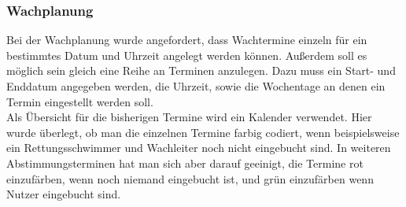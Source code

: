 \documentclass[fontsize=12pt,openright,oneside,paper=a4,BCOR=1cm]{scrbook}
\begin{document}
\subsubsection{Wachplanung}
Bei der Wachplanung wurde angefordert, dass Wachtermine einzeln für ein bestimmtes Datum und Uhrzeit angelegt werden können. Außerdem soll es möglich sein gleich eine Reihe an Terminen anzulegen. Dazu muss ein Start- und Enddatum angegeben werden, die Uhrzeit, sowie die Wochentage an denen ein Termin eingestellt werden soll. \\
Als Übersicht für die bisherigen Termine wird ein Kalender verwendet. Hier wurde überlegt, ob man die einzelnen Termine farbig codiert, wenn beispielsweise ein \glqq Rettungsschwimmer\grqq{} und \glqq Wachleiter\grqq{} noch nicht eingebucht sind. In weiteren Abstimmungsterminen hat man sich aber darauf geeinigt, die Termine rot einzufärben, wenn noch niemand eingebucht ist, und grün einzufärben wenn Nutzer eingebucht sind.
\end{document}
